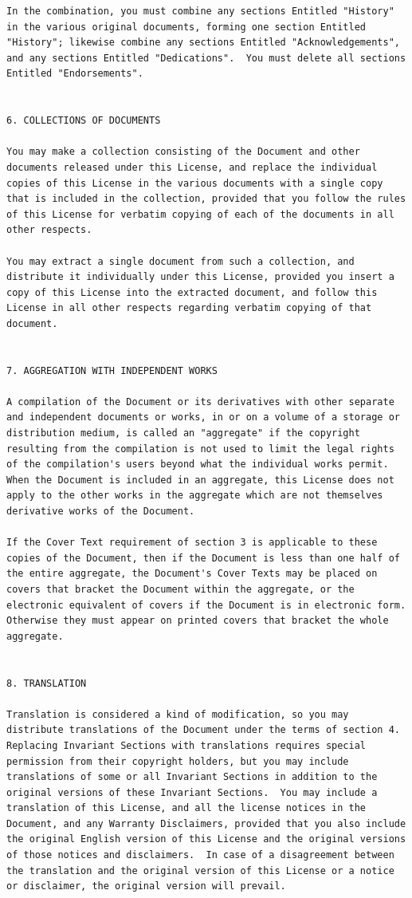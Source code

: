 \documentclass[letterpaper,10pt,english]{sphinxmanual}
\begin{document}
\begin{Verbatim}[commandchars=\\\{\}]
In the combination, you must combine any sections Entitled "History"
in the various original documents, forming one section Entitled
"History"; likewise combine any sections Entitled "Acknowledgements",
and any sections Entitled "Dedications".  You must delete all sections
Entitled "Endorsements".


6. COLLECTIONS OF DOCUMENTS

You may make a collection consisting of the Document and other
documents released under this License, and replace the individual
copies of this License in the various documents with a single copy
that is included in the collection, provided that you follow the rules
of this License for verbatim copying of each of the documents in all
other respects.

You may extract a single document from such a collection, and
distribute it individually under this License, provided you insert a
copy of this License into the extracted document, and follow this
License in all other respects regarding verbatim copying of that
document.


7. AGGREGATION WITH INDEPENDENT WORKS

A compilation of the Document or its derivatives with other separate
and independent documents or works, in or on a volume of a storage or
distribution medium, is called an "aggregate" if the copyright
resulting from the compilation is not used to limit the legal rights
of the compilation's users beyond what the individual works permit.
When the Document is included in an aggregate, this License does not
apply to the other works in the aggregate which are not themselves
derivative works of the Document.

If the Cover Text requirement of section 3 is applicable to these
copies of the Document, then if the Document is less than one half of
the entire aggregate, the Document's Cover Texts may be placed on
covers that bracket the Document within the aggregate, or the
electronic equivalent of covers if the Document is in electronic form.
Otherwise they must appear on printed covers that bracket the whole
aggregate.


8. TRANSLATION

Translation is considered a kind of modification, so you may
distribute translations of the Document under the terms of section 4.
Replacing Invariant Sections with translations requires special
permission from their copyright holders, but you may include
translations of some or all Invariant Sections in addition to the
original versions of these Invariant Sections.  You may include a
translation of this License, and all the license notices in the
Document, and any Warranty Disclaimers, provided that you also include
the original English version of this License and the original versions
of those notices and disclaimers.  In case of a disagreement between
the translation and the original version of this License or a notice
or disclaimer, the original version will prevail.


\end{Verbatim}
\end{document}
